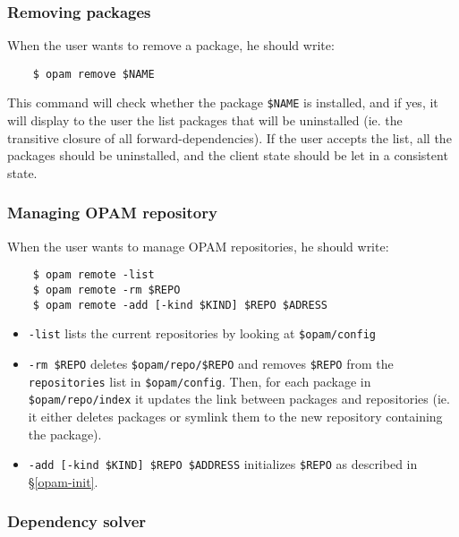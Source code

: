 \documentclass[a4paper,11pt]{article}
\begin{document}
\subsubsection{Removing packages}
\label{opam-remove}

When the user wants to remove a package, he should write:

\begin{verbatim}
    $ opam remove $NAME
\end{verbatim}

This command will check whether the package \verb+$NAME+ is installed,
and if yes, it will display to the user the list packages that will be
uninstalled (ie. the transitive closure of all forward-dependencies).
If the user accepts the list, all the packages should be uninstalled,
and the client state should be let in a consistent state.

\subsubsection{Managing OPAM repository}

When the user wants to manage OPAM repositories, he should write:

\begin{verbatim}
    $ opam remote -list
    $ opam remote -rm $REPO
    $ opam remote -add [-kind $KIND] $REPO $ADRESS
\end{verbatim}

\begin{itemize}
\item \verb+-list+ lists the current repositories by looking at
  \verb+$opam/config+
\item \verb+-rm $REPO+ deletes \verb+$opam/repo/$REPO+ and removes
  \verb+$REPO+ from the {\tt repositories} list in \verb+$opam/config+.
  Then, for each package in \verb+$opam/repo/index+ it updates the link
  between packages and repositories (ie. it either deletes packages or
  symlink them to the new repository containing the package).

\item \verb+-add [-kind $KIND] $REPO $ADDRESS+ initializes
  \verb+$REPO+ as described in \S\ref{opam-init}.

\end{itemize}

\subsubsection{Dependency solver}
\label{deps}
\end{document}
